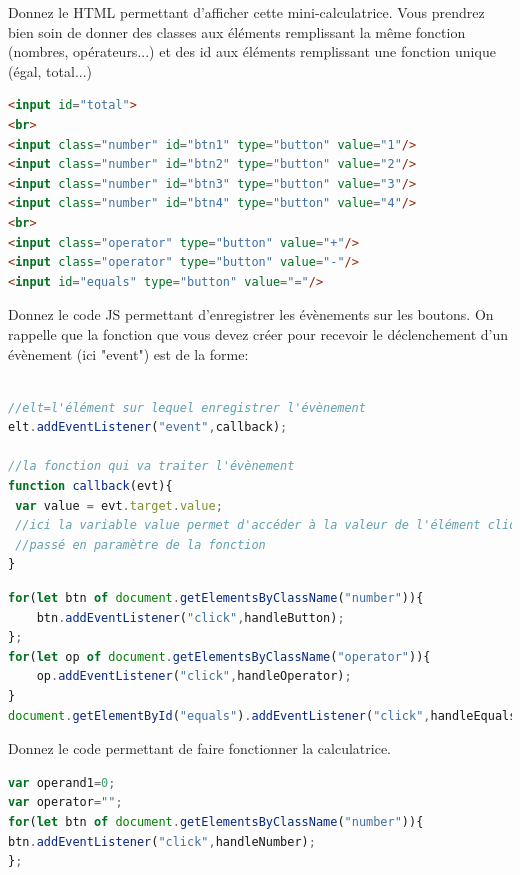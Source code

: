 \documentclass[a4paper,11pt]{exam}
\begin{document}
	\begin{questions}

		\question[4] Donnez le HTML permettant d'afficher cette mini-calculatrice. Vous prendrez bien soin de donner des classes aux éléments remplissant la même fonction (nombres, opérateurs...) et des id aux éléments remplissant une fonction unique (égal, total...)
		\begin{solutionorlines}[0cm]
			\begin{lstlisting}[frame=leftline,language={HTML},numbers=none]  
<input id="total">
<br>
<input class="number" id="btn1" type="button" value="1"/>
<input class="number" id="btn2" type="button" value="2"/>
<input class="number" id="btn3" type="button" value="3"/>
<input class="number" id="btn4" type="button" value="4"/>
<br>
<input class="operator" type="button" value="+"/>
<input class="operator" type="button" value="-"/>
<input id="equals" type="button" value="="/>
		    \end{lstlisting}
		\end{solutionorlines}
		\question[4] Donnez le code JS permettant d'enregistrer les évènements  sur les boutons. On rappelle que la fonction que vous devez créer pour recevoir le déclenchement d'un évènement (ici "event") est de la forme:
		\begin{lstlisting}[frame=leftline,language={JavaScript},numbers=none]  

//elt=l'élément sur lequel enregistrer l'évènement
elt.addEventListener("event",callback);

//la fonction qui va traiter l'évènement
function callback(evt){
 var value = evt.target.value;
 //ici la variable value permet d'accéder à la valeur de l'élément cliqué,
 //passé en paramètre de la fonction
}
		\end{lstlisting}
		\begin{solutionorlines}[0cm]
			\begin{lstlisting}[frame=leftline,language={JavaScript},numbers=none]  
for(let btn of document.getElementsByClassName("number")){
	btn.addEventListener("click",handleButton);
};
for(let op of document.getElementsByClassName("operator")){
	op.addEventListener("click",handleOperator);
}
document.getElementById("equals").addEventListener("click",handleEquals);
		    \end{lstlisting}
		\end{solutionorlines}

		\question[4] Donnez le code permettant de faire fonctionner la calculatrice.
		\begin{solutionorlines}[0cm]
			\begin{lstlisting}[frame=leftline,language={JavaScript},numbers=none]  
var operand1=0;
var operator="";
for(let btn of document.getElementsByClassName("number")){
btn.addEventListener("click",handleNumber);
};


\end{lstlisting}
\end{solutionorlines}
\end{questions}
\end{document}
